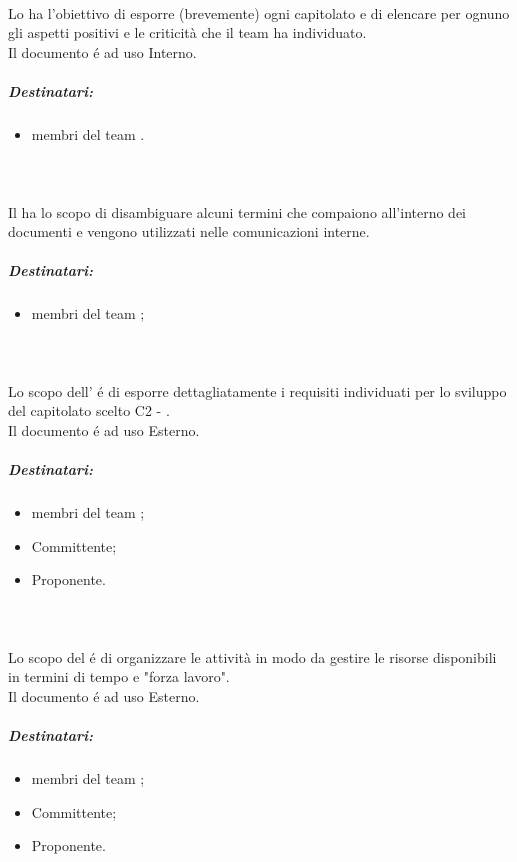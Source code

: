       \paragraph{\SdF\\}
      Lo \textit{\SdF{}} ha l'obiettivo di esporre (brevemente) ogni capitolato e di elencare per ognuno gli aspetti positivi e le criticità che il team ha individuato.\\
      Il documento é ad uso Interno.
      \subparagraph*{Destinatari:}
      \begin{itemize}
        \item membri del team \Gruppo{}.
      \end{itemize}
  
     \paragraph{\Glossario\\}
 	 Il \Glossario{}  ha lo scopo di disambiguare alcuni termini che compaiono all'interno dei documenti e vengono utilizzati nelle comunicazioni interne.
  	 \subparagraph*{Destinatari:}
  	 \begin{itemize}
  		\item membri del team \Gruppo{};
  	 \end{itemize}
  

      \paragraph{\AdR\\}
      Lo  scopo  dell'\textit{\AdR{}} é di esporre dettagliatamente i requisiti individuati per lo sviluppo del capitolato scelto C2 - \NomeProgetto{}.\\
      Il documento é ad uso Esterno.
      \subparagraph*{Destinatari:}
      \begin{itemize}
        \item membri del team \Gruppo{};
        \item Committente;
        \item Proponente.
      \end{itemize}

      \paragraph{\PdP\\}
      Lo scopo del \textit{\PdP{}} é di organizzare le attività in modo da gestire le risorse disponibili in termini di tempo e "forza lavoro".\\
      Il documento é ad uso Esterno.
      \subparagraph*{Destinatari:}
      \begin{itemize}
        \item membri del team \Gruppo{};
        \item Committente;
        \item Proponente.
      \end{itemize}

